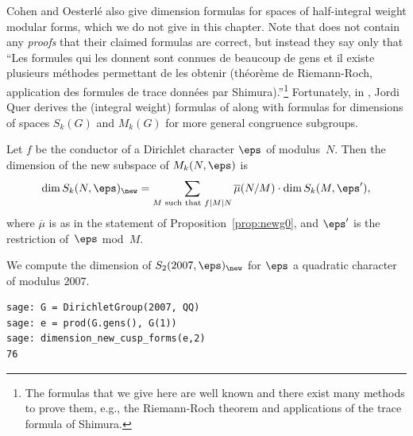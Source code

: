 \begin{remark}\label{rem:co}
  Cohen and Oesterl\'e also give dimension formulas for spaces of
  half-integral weight modular forms, which we do not give in this
  chapter.  Note that \cite{cohen-oesterle:dimensions} does not
  contain any {\em proofs} that their claimed formulas are correct,
  but instead they say only that ``Les formules qui les donnent sont
  connues de beaucoup de gens et il existe plusieurs m\'ethodes
  permettant de les obtenir (th\'eor\`eme de Riemann-Roch, application
  des formules de trace donn\'ees par Shimura).''\footnote{The formulas that
  we give here are well known and there exist many methods to prove
  them, e.g., the Riemann-Roch theorem and applications of the trace
  formula of Shimura.} Fortunately, in \cite{quer:dim},
  Jordi Quer derives the 
  (integral weight) formulas of \cite{cohen-oesterle:dimensions}
  along with formulas for dimensions of spaces $S_k(G)$ and
  $M_k(G)$ for more general congruence subgroups. 
\end{remark}

Let $f$ be the conductor of a Dirichlet character $\eps$ of modulus~$N$.  
Then the dimension of the new subspace of $M_k(N,\eps)$ is
$$
\dim S_k(N,\eps)_{\new} = 
     \sum_{M\text{ such that }f \mid M \mid N} \overline{\mu}(N/M) \cdot \dim S_k(M,\eps'),
$$
where $\overline{\mu}$ is as in the statement
of Proposition~\ref{prop:newg0}, and $\eps'$ is the restriction
of~$\eps$ mod~$M$.

\begin{example}
We compute the dimension of $S_2(2007,\eps)_{\new}$
for $\eps$ a quadratic character of modulus $2007$.
\begin{verbatim}
sage: G = DirichletGroup(2007, QQ)
sage: e = prod(G.gens(), G(1))
sage: dimension_new_cusp_forms(e,2)
76
\end{verbatim}
\end{example}



